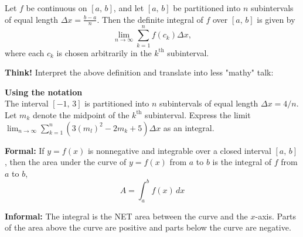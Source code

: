 \documentclass[addpoints, 12pt]{exam}
\begin{document}
\begin{tcolorbox}[title= LIMIT DEFINITION OF THE DEFINITE INTEGRAL, black,sharp corners,colback=white,colbacktitle=white,coltitle=black,boxrule=1pt]

     Let $f$ be continuous on $[a,\,b]$, and let $[a,\,b]$ be partitioned into $n$ subintervals of equal length $\displaystyle \Delta x=\frac{b-a}{n}$. Then the definite integral of $f$ over $[a,\,b]$ is given by
     \[\lim_{n\to\infty}\sum_{k=1}^n f\left(c_k\right)\Delta x,\]
     where each $c_k$ is chosen arbitrarily in the $k^{\text{th}}$ subinterval.
    
\end{tcolorbox}

\noindent\textbf{Think!} Interpret the above definition and translate into less "mathy" talk:

\textbf{Using the notation}\\
The interval $[-1,\,3]$ is partitioned into $n$ subintervals of equal length $\Delta x=4/n$. Let $m_k$ denote the midpoint of the $k^{\text{th}}$ subinterval. Express the limit $\displaystyle\lim_{n\to\infty}\sum_{k=1}^n \left( 3\left(m_l\right)^2-2m_k +5 \right)\Delta x$ as an integral.

\newpage

\begin{tcolorbox}[title= DEFINITION OF THE DEFINITE INTEGRAL, black,sharp corners,colback=white,colbacktitle=white,coltitle=black,boxrule=1pt]

     \textbf{Formal:} If $y=f(x)$ is nonnegative and integrable over a closed interval $[a,\,b]$, then the area under the curve of $y=f(x)$ from $a$ to $b$ is the integral of $f$ from $a$ to $b$,
     \[A=\int_a^b f(x)\,dx\]
     
     \textbf{Informal:} The integral is the NET area between the curve and the $x$-axis. Parts of the area above the curve are positive and parts below the curve are negative.
    
\end{tcolorbox}
\end{document}
